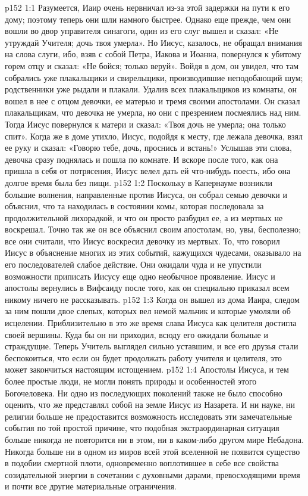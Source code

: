 \vs p152 1:1 Разумеется, Иаир очень нервничал из\hyp{}за этой задержки на пути к его дому; поэтому теперь они шли намного быстрее. Однако еще прежде, чем они вошли во двор управителя синагоги, один из его слуг вышел и сказал: «Не утруждай Учителя; дочь твоя умерла». Но Иисус, казалось, не обращал внимания на слова слуги, ибо, взяв с собой Петра, Иакова и Иоанна, повернулся к убитому горем отцу и сказал: «Не бойся; только веруй». Войдя в дом, он увидел, что там собрались уже плакальщики и свирельщики, производившие неподобающий шум; родственники уже рыдали и плакали. Удалив всех плакальщиков из комнаты, он вошел в нее с отцом девочки, ее матерью и тремя своими апостолами. Он сказал плакальщикам, что девочка не умерла, но они с презрением посмеялись над ним. Тогда Иисус повернулся к матери и сказал: «Твоя дочь не умерла; она только спит». Когда же в доме утихло, Иисус, подойдя к месту, где лежала девочка, взял ее руку и сказал: «Говорю тебе, дочь, проснись и встань!» Услышав эти слова, девочка сразу поднялась и пошла по комнате. И вскоре после того, как она пришла в себя от потрясения, Иисус велел дать ей что\hyp{}нибудь поесть, ибо она долгое время была без пищи.
\vs p152 1:2 Поскольку в Капернауме возникли большие волнения, направленные против Иисуса, он собрал семью девочки и объяснил, что та находилась в состоянии комы, которая последовала за продолжительной лихорадкой, и что он просто разбудил ее, а из мертвых не воскрешал. Точно так же он все объяснил своим апостолам, но, увы, бесполезно; все они считали, что Иисус воскресил девочку из мертвых. То, что говорил Иисус в объяснение многих из этих событий, кажущихся чудесами, оказывало на его последователей слабое действие. Они ожидали чуда и не упустили возможности приписать Иисусу еще одно необычное проявление. Иисус и апостолы вернулись в Вифсаиду после того, как он специально приказал всем никому ничего не рассказывать.
\vs p152 1:3 \pc Когда он вышел из дома Иаира, следом за ним пошли двое слепых, которых вел немой мальчик и которые умоляли об исцелении. Приблизительно в это же время слава Иисуса как целителя достигла своей вершины. Куда бы он ни приходил, всюду его ожидали больные и страждущие. Теперь Учитель выглядел сильно уставшим, и все его друзья стали беспокоиться, что если он будет продолжать работу учителя и целителя, это может закончиться настоящим истощением.
\vs p152 1:4 \pc Апостолы Иисуса, и тем более простые люди, не могли понять природы и особенностей этого Богочеловека. Ни одно из последующих поколений также не было способно оценить, что же представлял собой на земле Иисус из Назарета. И ни науке, ни религии больше не предоставится возможность исследовать эти замечательные события по той простой причине, что подобная экстраординарная ситуация больше никогда не повторится ни в этом, ни в каком\hyp{}либо другом мире Небадона. Никогда больше ни в одном из миров всей этой вселенной не появится существо в подобии смертной плоти, одновременно воплотившее в себе все свойства созидательной энергии в сочетании с духовными дарами, превосходящими время и почти все другие материальные ограничения.
